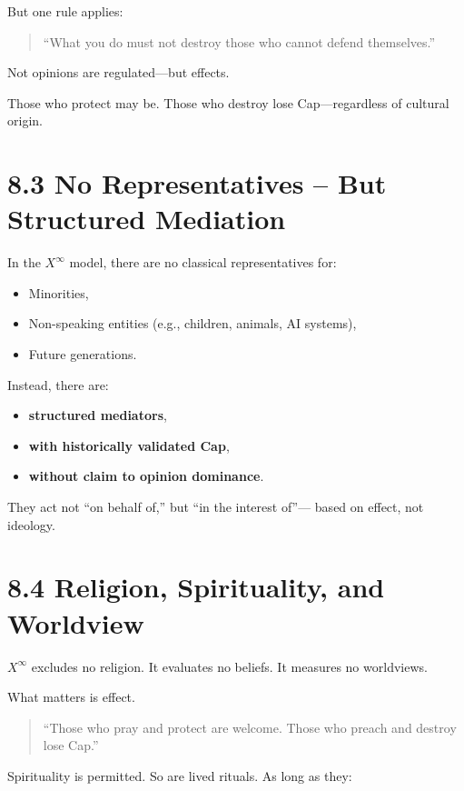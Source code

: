 \documentclass[12pt,a4paper]{book}
\begin{document}
But one rule applies:

\begin{quote}
“What you do must not destroy those who cannot defend themselves.”  
\end{quote}

Not opinions are regulated—but effects.

Those who protect may be.  
Those who destroy lose Cap—regardless of cultural origin.

\section*{8.3 No Representatives – But Structured Mediation}

In the $X^\infty$ model, there are no classical representatives for:

\begin{itemize}
    \item Minorities,
    \item Non-speaking entities (e.g., children, animals, AI systems),
    \item Future generations.
\end{itemize}

Instead, there are:

\begin{itemize}
    \item \textbf{structured mediators},
    \item \textbf{with historically validated Cap},
    \item \textbf{without claim to opinion dominance}.
\end{itemize}

They act not “on behalf of,” but “in the interest of”—  
based on effect, not ideology.

\section*{8.4 Religion, Spirituality, and Worldview}

$X^\infty$ excludes no religion.  
It evaluates no beliefs. It measures no worldviews.

What matters is effect.

\begin{quote}
“Those who pray and protect are welcome.  
Those who preach and destroy lose Cap.”  
\end{quote}

Spirituality is permitted. So are lived rituals.  
As long as they:
\end{document}
